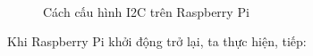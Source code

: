 \begin{figure}
	\hspace{1cm}
	\\
	
\caption{Cách cấu hình I2C trên Raspberry Pi} \label{Fig:I2C}
\end{figure}
Khi Raspberry Pi khởi động trở lại, ta thực hiện, tiếp:
